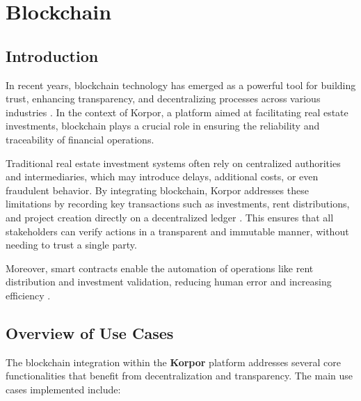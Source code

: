 \chapter{Blockchain}


\section*{Introduction}

In recent years, blockchain technology has emerged as a powerful tool for building trust, enhancing transparency, and decentralizing processes across various industries \cite{Nakamoto2008Bitcoin, Tapscott2016Blockchain}. In the context of Korpor, a platform aimed at facilitating real estate investments, blockchain plays a crucial role in ensuring the reliability and traceability of financial operations.

Traditional real estate investment systems often rely on centralized authorities and intermediaries, which may introduce delays, additional costs, or even fraudulent behavior. By integrating blockchain, Korpor addresses these limitations by recording key transactions such as investments, rent distributions, and project creation directly on a decentralized ledger \cite{Veuger2018RealEstateBlockchain}. This ensures that all stakeholders can verify actions in a transparent and immutable manner, without needing to trust a single party.

Moreover, smart contracts enable the automation of operations like rent distribution and investment validation, reducing human error and increasing efficiency \cite{Buterin2014Ethereum, Szabo1997SmartContracts}.

\section{Overview of Use Cases}

The blockchain integration within the \textbf{\textcolor{primary}{Korpor}} platform addresses several core functionalities that benefit from decentralization and transparency. The main use cases implemented include:

